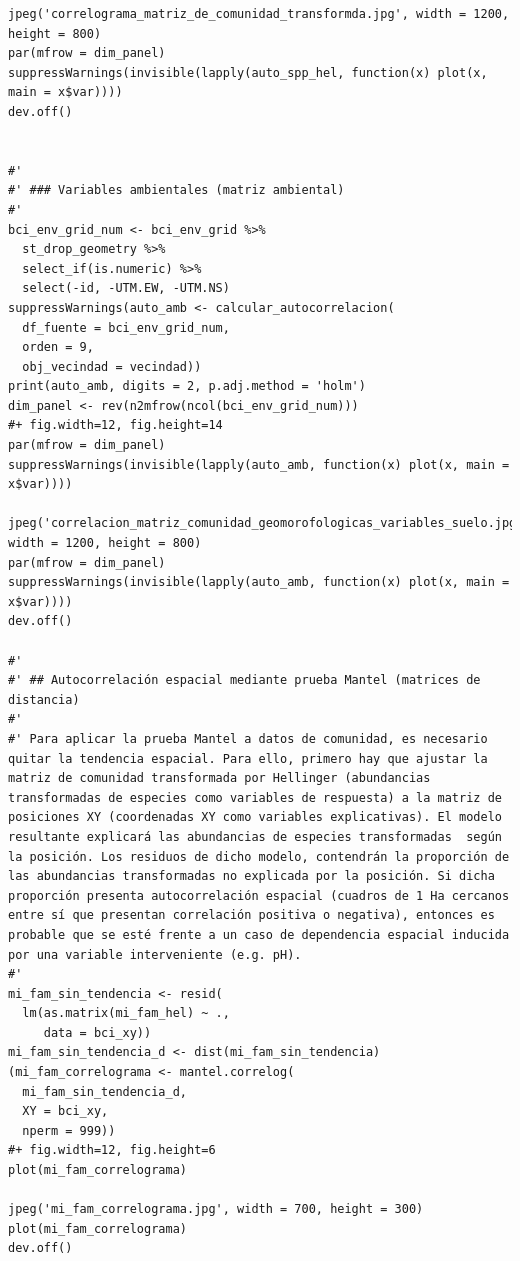 \documentclass[11pt,]{article}
\begin{document}
\begin{verbatim}
jpeg('correlograma_matriz_de_comunidad_transformda.jpg', width = 1200, height = 800)
par(mfrow = dim_panel)
suppressWarnings(invisible(lapply(auto_spp_hel, function(x) plot(x, main = x$var))))
dev.off()


#' 
#' ### Variables ambientales (matriz ambiental)
#' 
bci_env_grid_num <- bci_env_grid %>%
  st_drop_geometry %>% 
  select_if(is.numeric) %>% 
  select(-id, -UTM.EW, -UTM.NS)
suppressWarnings(auto_amb <- calcular_autocorrelacion(
  df_fuente = bci_env_grid_num,
  orden = 9,
  obj_vecindad = vecindad))
print(auto_amb, digits = 2, p.adj.method = 'holm')
dim_panel <- rev(n2mfrow(ncol(bci_env_grid_num)))
#+ fig.width=12, fig.height=14
par(mfrow = dim_panel)
suppressWarnings(invisible(lapply(auto_amb, function(x) plot(x, main = x$var))))

jpeg('correlacion_matriz_comunidad_geomorofologicas_variables_suelo.jpg', width = 1200, height = 800)
par(mfrow = dim_panel)
suppressWarnings(invisible(lapply(auto_amb, function(x) plot(x, main = x$var))))
dev.off()

#' 
#' ## Autocorrelación espacial mediante prueba Mantel (matrices de distancia)
#' 
#' Para aplicar la prueba Mantel a datos de comunidad, es necesario quitar la tendencia espacial. Para ello, primero hay que ajustar la matriz de comunidad transformada por Hellinger (abundancias transformadas de especies como variables de respuesta) a la matriz de posiciones XY (coordenadas XY como variables explicativas). El modelo resultante explicará las abundancias de especies transformadas  según la posición. Los residuos de dicho modelo, contendrán la proporción de las abundancias transformadas no explicada por la posición. Si dicha proporción presenta autocorrelación espacial (cuadros de 1 Ha cercanos entre sí que presentan correlación positiva o negativa), entonces es probable que se esté frente a un caso de dependencia espacial inducida por una variable interveniente (e.g. pH).
#' 
mi_fam_sin_tendencia <- resid(
  lm(as.matrix(mi_fam_hel) ~ .,
     data = bci_xy))
mi_fam_sin_tendencia_d <- dist(mi_fam_sin_tendencia)
(mi_fam_correlograma <- mantel.correlog(
  mi_fam_sin_tendencia_d,
  XY = bci_xy,
  nperm = 999))
#+ fig.width=12, fig.height=6
plot(mi_fam_correlograma)

jpeg('mi_fam_correlograma.jpg', width = 700, height = 300)
plot(mi_fam_correlograma)
dev.off()



\end{verbatim}
\end{document}

